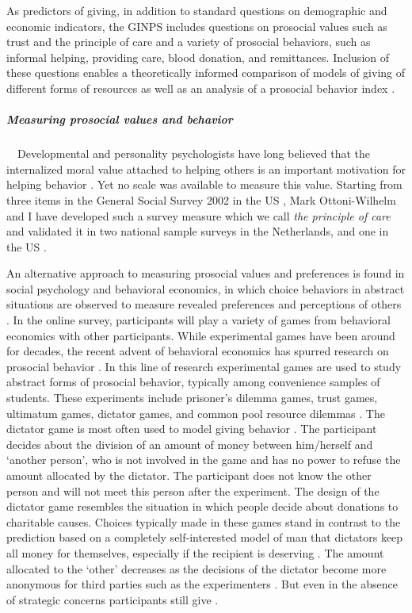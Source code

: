 \documentclass[twocolumn, serif, rga, numeric]{jote-article}
\begin{document}
As predictors of giving, in addition to standard questions on demographic and economic indicators, the GINPS includes questions on prosocial values such as trust and the principle of care and a variety of prosocial behaviors, such as informal helping, providing care, blood donation, and remittances. Inclusion of these questions enables a theoretically informed comparison of models of giving of different forms of resources \cite{Bekkers2006, Lee1999} as well as an analysis of a prosocial behavior index \cite{Wilhelm2010, Hardy2005}.

\subparagraph{Measuring prosocial values and behavior}

\ \ Developmental and personality psychologists have long believed that the internalized moral value attached to helping others is an important motivation for helping behavior \cite{Hoffman2000, Eisenberg1982}. Yet no scale was available to measure this value. Starting from three items in the General Social Survey 2002 in the US \cite{Wilhelm2010}, Mark Ottoni-Wilhelm and I have developed such a survey measure which we call \emph{the principle of care} and validated it in two national sample surveys in the Netherlands, and one in the US \cite{Bekkers2016c}.

An alternative approach to measuring prosocial values and preferences is found in social psychology and behavioral economics, in which choice behaviors in abstract situations are observed to measure revealed preferences and perceptions of others \cite{VanLange2013}. In the online survey, participants will play a variety of games from behavioral economics with other participants. While experimental games have been around for decades, the recent advent of behavioral economics has spurred research on prosocial behavior \cite{Wilson2011}. In this line of research experimental games are used to study abstract forms of prosocial behavior, typically among convenience samples of students. These experiments include prisoner's dilemma games, trust games, ultimatum games, dictator games, and common pool resource dilemmas \cite{VanLange2013}. The dictator game is most often used to model giving behavior \cite{Camerer2003}. The participant decides about the division of an amount of money between him/herself and `another person', who is not involved in the game and has no power to refuse the amount allocated by the dictator. The participant does not know the other person and will not meet this person after the experiment. The design of the dictator game resembles the situation in which people decide about donations to charitable causes.
Choices typically made in these games stand in contrast to the prediction based on a completely self-interested model of man that dictators keep all money for themselves, especially if the recipient is deserving \cite{Eckel1996}. The amount allocated to the `other' decreases as the decisions of the dictator become more anonymous for third parties such as the experimenters \cite{Eichenberger1998}.
But even in the absence of strategic concerns participants still give \cite{Engel2011}.
\end{document}
